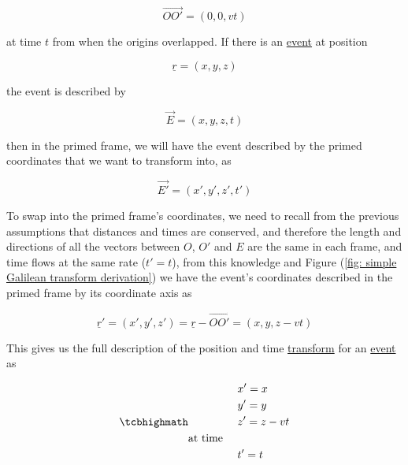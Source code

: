 \begin{equation}
	\vec{OO{'}} = (0,0,{v}{t})
\end{equation}

at time ${t}$ from when the origins overlapped.
If there is an \hyperlink{def-event}{event} at position

\begin{equation}
	\underline{r} = ({x},{y},{z})
\end{equation}

the event is described by

\begin{equation}
	\vec{E} = ({x},{y},{z},{t})
\end{equation}

then in the primed frame, we will have the event described by the primed coordinates that we want to transform into, as

\begin{equation}
	\vec{E{'}} = ({x{'}},{y{'}},{z{'}},t{'})
\end{equation}

To swap into the primed frame's coordinates, we need to recall from the previous assumptions that distances and times are conserved, and therefore the length and directions of all the vectors between ${O}$, ${O'}$ and ${E}$ are the same in each frame, and time flows at the same rate (${t'} = {t}$), from this knowledge and Figure (\ref{fig: simple Galilean transform derivation}) we have the event's coordinates described in the primed frame by its coordinate axis as

\begin{equation}
	{\underline{r}{'}} = ({x{'}},{y{'}},{z{'}}) = \underline{r}-\vec{OO{'}} = ({x},{y},{z}-{v}{t})
	\label{eq: classical event}
\end{equation}

This gives us the full description of the position and time \hyperlink{def-transform}{transform} for an \hyperlink{def-event}{event} as

\begin{equation}
	\mhl{
		\begin{aligned}
			 & {x{'}} = {x}        \\
			 & {y{'}} = {y}        \\
			 & {z{'}} = {z}-{v}{t} \\
			\text{at time \ \ \ }  \\
			 & {t{'}}= {t}
		\end{aligned}
	}
	\label{eq: Galilean transformation}
\end{equation}

